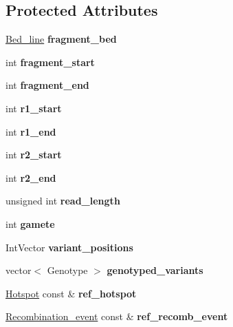 \subsection*{Protected Attributes}
\begin{DoxyCompactItemize}
\item 
\mbox{\label{class_fragment_a4aa415a39979a122892f7c2b256f8405}} 
\mbox{\hyperlink{struct_bed__line}{Bed\+\_\+line}} {\bfseries fragment\+\_\+bed}
\item 
\mbox{\label{class_fragment_a72b65c46e7a0085ad88b4fc36b1a1d6e}} 
int {\bfseries fragment\+\_\+start}
\item 
\mbox{\label{class_fragment_a05333835ced79a717d6cb58f43646ace}} 
int {\bfseries fragment\+\_\+end}
\item 
\mbox{\label{class_fragment_a60d6cae384b1f01e52019bcdcefbde66}} 
int {\bfseries r1\+\_\+start}
\item 
\mbox{\label{class_fragment_a2d0974c4d6411fad195e2e04c48721ae}} 
int {\bfseries r1\+\_\+end}
\item 
\mbox{\label{class_fragment_a241bae38bc25636b087823d2ea4879f8}} 
int {\bfseries r2\+\_\+start}
\item 
\mbox{\label{class_fragment_a13e2711d5175401b1b908d409e02316a}} 
int {\bfseries r2\+\_\+end}
\item 
\mbox{\label{class_fragment_a530bfc880a0010765ef54f1a9e5dca06}} 
unsigned int {\bfseries read\+\_\+length}
\item 
\mbox{\label{class_fragment_a83daf7b6db65e62fb60aef6dffc69d32}} 
int {\bfseries gamete}
\item 
\mbox{\label{class_fragment_a0a2264007e1a03572f2bd49001a07f57}} 
Int\+Vector {\bfseries variant\+\_\+positions}
\item 
\mbox{\label{class_fragment_aee8b36d3a1a1d9db6aa2d56f5cdabae6}} 
vector$<$ Genotype $>$ {\bfseries genotyped\+\_\+variants}
\item 
\mbox{\label{class_fragment_ac2ec9549f18945133be4396d62431694}} 
\mbox{\hyperlink{class_hotspot}{Hotspot}} const  \& {\bfseries ref\+\_\+hotspot}
\item 
\mbox{\label{class_fragment_ac73054faebcc154000bd1f022341e191}} 
\mbox{\hyperlink{class_recombination__event}{Recombination\+\_\+event}} const  \& {\bfseries ref\+\_\+recomb\+\_\+event}
\end{DoxyCompactItemize}


